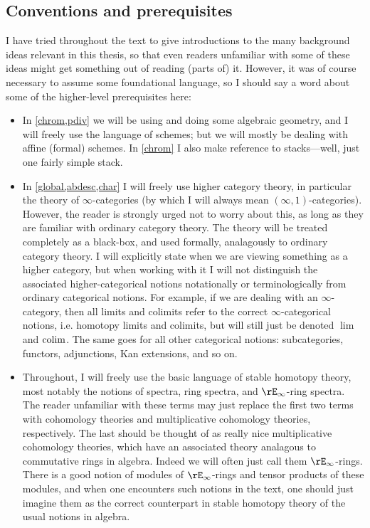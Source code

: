 
\subsection{Conventions and prerequisites}
\label{intro-conventions}

I have tried throughout the text to give introductions to the many
background ideas relevant in this thesis, so that even readers
unfamiliar with some of these ideas might get something out of reading
(parts of) it. However, it was of course necessary to assume some
foundational language, so I should say a word about some of the
higher-level prerequisites here:
\begin{itemize}
\item In \cref{chrom,pdiv} we will be using and doing some algebraic
  geometry, and I will freely use the language of schemes; but we will
  mostly be dealing with affine (formal) schemes. In \cref{chrom} I
  also make reference to stacks---well, just one fairly simple stack.
\item In \cref{global,abdesc,char} I will freely use higher category
  theory, in particular the theory of $\infty$-categories (by which I
  will always mean $(\infty,1)$-categories). However, the reader is
  strongly urged not to worry about this, as long as they are familiar
  with ordinary category theory. The theory will be treated completely
  as a black-box, and used formally, analagously to ordinary category
  theory. I will explicitly state when we are viewing something as a
  higher category, but when working with it I will not distinguish the
  associated higher-categorical notions notationally or
  terminologically from ordinary categorical notions. For example, if
  we are dealing with an $\infty$-category, then all limits and
  colimits refer to the correct $\infty$-categorical notions,
  i.e. homotopy limits and colimits, but will still just be denoted
  $\lim$ and $\operatorname*{colim}$. The same goes for all other categorical
  notions: subcategories, functors, adjunctions, Kan extensions, and
  so on.
\item Throughout, I will freely use the basic language of stable
  homotopy theory, most notably the notions of spectra, ring spectra,
  and $\rE_\infty$-ring spectra. The reader unfamiliar with these
  terms may just replace the first two terms with cohomology theories
  and multiplicative cohomology theories, respectively. The last
  should be thought of as really nice multiplicative cohomology
  theories, which have an associated theory analagous to commutative
  rings in algebra. Indeed we will often just call them
  $\rE_\infty$-rings. There is a good notion of modules of
  $\rE_\infty$-rings and tensor products of these modules, and when
  one encounters such notions in the text, one should just imagine
  them as the correct counterpart in stable homotopy theory of the
  usual notions in algebra.
\end{itemize}

